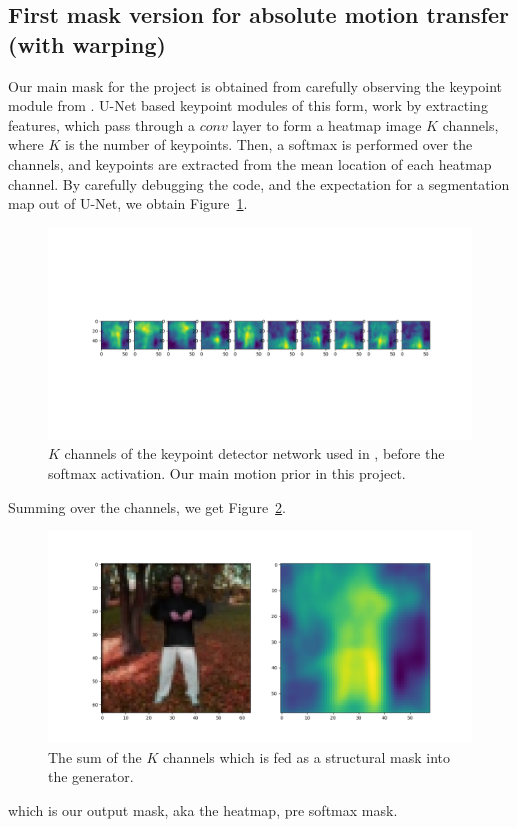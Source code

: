\documentclass{article}
\begin{document}
\subsection{First mask version for absolute motion transfer (with warping)}
\label{heatmap-mask}
Our main mask for the project is obtained from carefully observing the
keypoint module from \cite{siarohin2020order}. U-Net based keypoint
modules of this form, work by extracting features, which pass through a
$\textit{conv}$ layer to form a heatmap image $K$ channels, where $K$ is the
number of keypoints. Then, a softmax is performed over the channels, and
keypoints are extracted from the mean location of each heatmap channel.
By carefully debugging the code, and the expectation for a segmentation map
out of U-Net, we obtain Figure~\ref{mask-10kp}.
\begin{figure}[ht]
\vskip 0.2in
\begin{center}
\centerline{\includegraphics[width=\columnwidth]{visualizations/mask_10kp}}
\caption{
$K$ channels of the keypoint detector network used in
\cite{siarohin2020order}, before the softmax activation. Our main motion
prior in this project.
}
\label{mask-10kp}
\end{center}
\vskip -0.2in
\end{figure}

Summing over the channels, we get Figure~\ref{mask-sum}.

\begin{figure}[ht]
\vskip 0.2in
\begin{center}
\centerline{\includegraphics[width=\columnwidth]{visualizations/mask_sum}}
\caption{
The sum of the $K$ channels which is fed as a structural mask into the
generator.
}
\label{mask-sum}
\end{center}
\vskip -0.2in
\end{figure}
which is our output mask, aka the heatmap, pre softmax mask.
\end{document}
